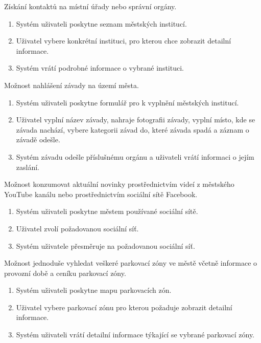 Získání kontaktů na místní úřady nebo správní orgány. 

\begin{enumerate}
  \item Systém uživateli poskytne seznam městských institucí.
  \item Uživatel vybere konkrétní instituci, pro kterou chce zobrazit detailní informace.
  \item Systém vrátí podrobné informace o vybrané instituci.  
\end{enumerate}

Možnost nahlášení závady na území města.

\begin{enumerate}
  \item Systém uživateli poskytne formulář pro k vyplnění městských institucí.
  \item Uživatel vyplní název závady, nahraje fotografii závady, vyplní místo, kde se závada nachází, vybere kategorii závad do, které závada spadá a 
  záznam o závadě odešle.
  \item Systém závadu odešle příslušnému orgánu a uživateli vrátí informaci o jejím zaslání.
  
\end{enumerate}

Možnost konzumovat aktuální novinky prostřednictvím videí z městského YouTube kanálu nebo prostřednictvím sociální sítě Facebook.

\begin{enumerate}
  \item Systém uživateli poskytne městem používané sociální sítě.
  \item Uživatel zvolí požadovanou sociální síť.
  \item Systém uživatele přesměruje na požadovanou sociální síť.
\end{enumerate}

Možnost jednoduše vyhledat veškeré parkovací zóny ve městě včetně informace o provozní době a ceníku parkovací zóny.

\begin{enumerate}
  \item Systém uživateli poskytne mapu parkovacích zón.
  \item Uživatel vybere parkovací zónu pro kterou požaduje zobrazit detailní informace.
  \item Systém uživateli vrátí detailní informace týkající se vybrané parkovací zóny.
\end{enumerate}

